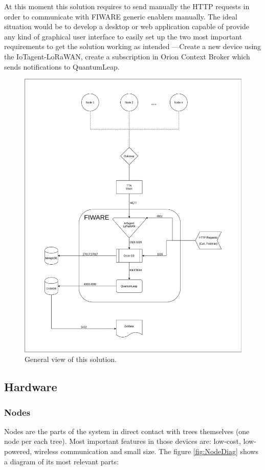 \documentclass[11pt,a4paper,dvipsnames,twoside]{article}
\begin{document}
At this moment this solution requires to send manually the HTTP requests in order to communicate with FIWARE generic enablers manually. The ideal situation would be to develop a desktop or web application capable of provide any kind of graphical user interface to easily set up the two most important requirements to get the solution working as intended ---Create a new device using the IoTagent-LoRaWAN, create a subscription in Orion Context Broker which sends notifications to QuantumLeap.

\begin{figure}[htp]
  \centering
  \includegraphics[width=\textwidth]{../schemes/main_scheme_tbg.png}
  \caption{General view of this solution.}
  \label{fig:GenView}
\end{figure}

\subsection{Hardware}

\subsubsection{Nodes}
Nodes are the parts of the system in direct contact with trees themselves (one node per each tree). Most important features in those devices are: low-cost, low-powered, wireless communication and small size. The figure \ref{fig:NodeDiag} shows a diagram of its most relevant parts:
\end{document}
